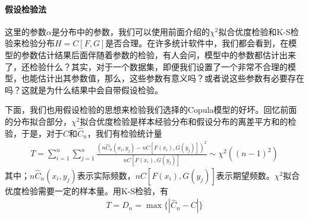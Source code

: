             \paragraph{假设检验法}这里的参数$\alpha$是分布中的参数，我们可以使用前面介绍的$\chi^2$拟合优度检验和K-S检验来检验分布$H = C[F,G]$是否合理。在许多统计软件中，我们都会看到，在模型的参数估计结果后面伴随着参数的检验，有人会问，模型中的参数都估计出来了，还检验什么？其实，对于一个数据集，即便我们设置了一个非常不合理的模型，也能估计出其参数值，那么，这些参数有意义吗？或者说这些参数有必要存在吗？这就是为什么结果中会自带假设检验。
            \par
            下面，我们也用假设检验的思想来检验我们选择的Copula模型的好坏。回忆前面的分布拟合部分，$\chi^2$拟合优度检验是样本经验分布和假设分布的离差平方和的检验，于是，对于$C$和$\hat{C}_n$，我们有检验统计量
            \begin{align*}
            T = \sum_{i=1}^n\sum_{j = 1}^n \frac{\left( n\hat{C}_n(x_i,y_j) - n C[F(x_i),G(y_j)] \right)^2 }{n C[F(x_i),G(y_j)]} \sim \chi^2((n-1)^2)
            \end{align*}
            其中；$ n\hat{C}_n(x_i,y_j)$表示实际频数，$n C[F(x_i),G(y_j)]$表示期望频数。$\chi^2$拟合优度检验需要一定的样本量。用K-S检验，有
            \begin{align*}
            T = D_n = \max \{|\hat{C}_n - C|\}
            \end{align*}
